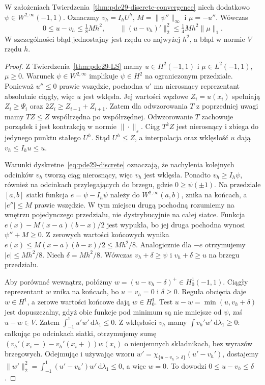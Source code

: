 \begin{twierdzenie}
\label{thm:pde29-discrete-error}
W założeniach Twierdzenia~\ref{thm:pde29-discrete-convergence}
niech dodatkowo $\psi\in W^{2,\infty}(-1,1)$.
Oznaczmy $v_h=I_hU^h$, $M=\|\psi''\|_\infty$
i $\mu=-u''$. Wówczas
\[
 0\le u-v_h\le \tfrac18Mh^2,\qquad
 \|(u-v_h)'\|_2^2\le\tfrac14Mh^2\|\mu\|_1.
\]
W szczególności błąd jednostajny jest rzędu
co najwyżej $h^2$, a błąd w normie $V$ rzędu $h$.
\end{twierdzenie}
\begin{proof}
Z Twierdzenia~\ref{thm:pde29-LS} mamy
$u\in H^2(-1,1)$ i $\mu\in L^2(-1,1)$,
$\mu\ge0$. Warunek $\psi\in W^{2,\infty}$
implikuje $\psi\in H^2$ na ograniczonym przedziale.
Ponieważ $u''\le0$ prawie wszędzie, pochodna $u'$
ma nierosnący reprezentant absolutnie ciągły,
więc $u$ jest wklęsła.
Jej wartości węzłowe $Z_i=u(x_i)$ spełniają
$Z_i\ge\Psi_i$ oraz $2Z_i\ge Z_{i-1}+Z_{i+1}$.
Zatem dla odwzorowania $T$ z poprzedniej uwagi
mamy $TZ\le Z$ współrzędna po współrzędnej.
Odwzorowanie $T$ zachowuje porządek i jest
kontrakcją w normie $\|\cdot\|_s$.
Ciąg $T^kZ$ jest nierosnący i zbiega do
jedynego punktu stałego $U^h$. Stąd $U^h\le Z$,
a interpolacja oraz wklęsłość $u$ dają
$v_h\le I_hu\le u$.

Warunki dyskretne~\eqref{eq:pde29-discrete}
oznaczają, że nachylenia kolejnych odcinków
$v_h$ tworzą ciąg nierosnący, więc $v_h$ jest
wklęsła. Ponadto $v_h\ge I_h\psi$, również na
odcinkach przylegających do brzegu, gdzie
$0\ge\psi(\pm1)$.
Na przedziale $[a,b]$ siatki funkcja
$e=\psi-I_h\psi$ należy do $W^{2,\infty}(a,b)$,
znika na końcach, a $|e''|\le M$ prawie wszędzie.
W tym miejscu drugą pochodną rozumiemy
na wnętrzu pojedynczego przedziału, nie
dystrybucyjnie na całej siatce.
Funkcja $e(x)-M(x-a)(b-x)/2$ jest wypukła,
bo jej druga pochodna wynosi $\psi''+M\ge0$.
Z zerowych wartości końcowych wynika
$e(x)\le M(x-a)(b-x)/2\le Mh^2/8$.
Analogicznie dla $-e$ otrzymujemy
$|e|\le Mh^2/8$.
Niech $\delta=Mh^2/8$.
Wówczas $v_h+\delta\ge\psi$ i
$v_h+\delta\ge u$ na brzegu przedziału.

Aby porównać wewnątrz, połóżmy
$w=(u-v_h-\delta)^+\in H_0^1(-1,1)$.
Ciągły reprezentant $w$ znika na końcach,
bo $u=v_h=0$ i $\delta\ge0$.
Reguła obcięcia daje $w\in H^1$, a zerowe
wartości końcowe dają $w\in H_0^1$.
Test $u-w=\min(u,v_h+\delta)$ jest dopuszczalny,
gdyż obie funkcje pod minimum są nie mniejsze
od $\psi$, zaś $u-w\in V$.
Zatem $\int_{-1}^1 u'w'\,\mathrm d\lambda_1\le0$.
Z wklęsłości $v_h$ mamy
$\int v_h'w'\,\mathrm d\lambda_1\ge0$:
całkując po odcinkach siatki, otrzymujemy
sumę $(v_h'(x_i-)-v_h'(x_i+))w(x_i)$
o nieujemnych składnikach, bez wyrazów brzegowych.
Odejmując i używając wzoru
$w'=\chi_{\{u-v_h>\delta\}}(u'-v_h')$,
dostajemy
$\|w'\|_2^2=\int_{-1}^1(u'-v_h')w'\,\mathrm d\lambda_1\le0$,
a więc $w=0$. To dowodzi $0\le u-v_h\le\delta$.


\end{proof}

